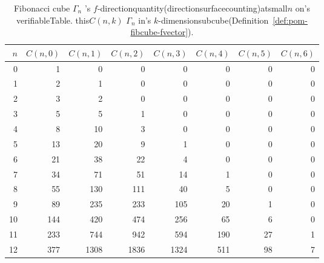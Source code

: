\begin{table}[H]
\centering
\scriptsize
\setlength{\tabcolsep}{5pt}
\caption{Fibonacci cube $\Gamma_n$ 's  $f$-directionquantity(directionsurfacecounting)atsmall$n$ on's verifiableTable. this$C(n,k)$ $\Gamma_n$ in's  $k$-dimensionsubcube(Definition~\ref{def:pom-fibcube-fvector}). }
\label{tab:fibonacci_cube_fvector_small_n}
\begin{tabular}{r r r r r r r r}
\toprule
$n$ & $C(n,0)$ & $C(n,1)$ & $C(n,2)$ & $C(n,3)$ & $C(n,4)$ & $C(n,5)$ & $C(n,6)$\\
\midrule
0 & 1 & 0 & 0 & 0 & 0 & 0 & 0\\
1 & 2 & 1 & 0 & 0 & 0 & 0 & 0\\
2 & 3 & 2 & 0 & 0 & 0 & 0 & 0\\
3 & 5 & 5 & 1 & 0 & 0 & 0 & 0\\
4 & 8 & 10 & 3 & 0 & 0 & 0 & 0\\
5 & 13 & 20 & 9 & 1 & 0 & 0 & 0\\
6 & 21 & 38 & 22 & 4 & 0 & 0 & 0\\
7 & 34 & 71 & 51 & 14 & 1 & 0 & 0\\
8 & 55 & 130 & 111 & 40 & 5 & 0 & 0\\
9 & 89 & 235 & 233 & 105 & 20 & 1 & 0\\
10 & 144 & 420 & 474 & 256 & 65 & 6 & 0\\
11 & 233 & 744 & 942 & 594 & 190 & 27 & 1\\
12 & 377 & 1308 & 1836 & 1324 & 511 & 98 & 7\\
\bottomrule
\end{tabular}
\end{table}
